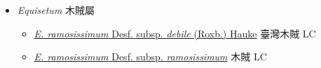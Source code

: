 
  \begin{itemize}
 \item[] \textit{Equisetum} 木賊屬
                    
  \begin{itemize}
        \item[] \href{http://www.theplantlist.org/tpl1.1/search?q=Equisetum+ramosissimum+subsp.+debile}{\textit{E. ramosissimum} Desf. subsp. \textit{debile} (Roxb.) Hauke}   臺灣木賊 LC
        \item[] \href{http://www.theplantlist.org/tpl1.1/search?q=Equisetum+ramosissimum+subsp.+ramosissimum}{\textit{E. ramosissimum} Desf. subsp. \textit{ramosissimum}}   木賊 LC
  \end{itemize}
  \end{itemize}
